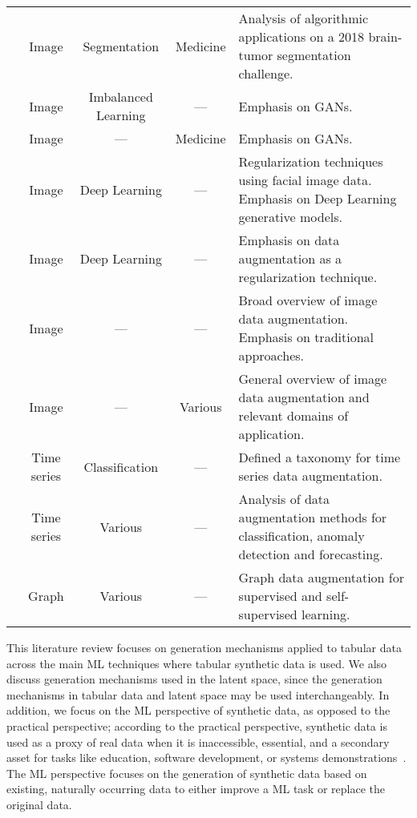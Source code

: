 \begin{table}[t!]
\begin{tabularx}{\textwidth}{@{}rcccX@{}}
        \cite{nalepa2019data} & Image & Segmentation & Medicine & Analysis of
        algorithmic applications on a 2018 brain-tumor segmentation
        challenge.\\

        \cite{sampath2021survey} & Image & Imbalanced Learning &
        --- & Emphasis on GANs. \\

        \cite{yi2019generative} & Image & --- & Medicine & Emphasis on GANs.\\

        \cite{wang2020survey} & Image & Deep Learning & --- & Regularization
        techniques using facial image data. Emphasis on Deep Learning
        generative models.\\

        \cite{Shorten2019} & Image & Deep Learning & --- & Emphasis on
        data augmentation as a regularization technique.\\

        \cite{khosla2020enhancing} & Image & --- & --- & Broad overview of
        image data augmentation. Emphasis on traditional approaches. \\

        \cite{khalifa2021comprehensive} & Image & --- & Various & General
        overview of image data augmentation and relevant domains of
        application.\\

        \cite{Iwana2021} & Time series & Classification & --- &
        Defined a taxonomy for time series data augmentation.\\

        \cite{wen2020time} & Time series & Various & --- & Analysis of data
        augmentation methods for classification, anomaly detection and
        forecasting.\\

        \cite{zhao2022graph} & Graph & Various & --- & Graph data
        augmentation for supervised and self-supervised learning.\\

        \bottomrule
        
    \end{tabularx}
\end{table}
\endgroup

This literature review focuses on generation mechanisms applied to tabular
data across the main ML techniques where tabular synthetic data is used.  We
also discuss generation mechanisms used in the latent space, since the
generation mechanisms in tabular data and latent space may be used
interchangeably. In addition, we focus on the ML perspective of synthetic
data, as opposed to the practical perspective; according to the practical
perspective, synthetic data is used as a proxy of real data when it is
inaccessible, essential, and a secondary asset for tasks like education,
software development, or systems demonstrations~\cite{mannino2019real}.
The ML perspective focuses on the generation of synthetic data based on
existing, naturally occurring data to either improve a ML task or replace the
original data. 

